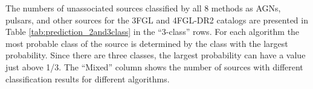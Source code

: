 \begin{table}[!h]
\centering
\hspace{-0.2cm}
    \vspace{2mm}
    \caption{Testing accuracy of the four selected algorithms for the 3-class classification of 4FGL-DR2 sources. 
    ``\_O'' denotes training with oversampling.}
    \label{tab:selected_algs_4fgl_multi}
\end{table}


The numbers of unassociated sources classified by all 8 methods as AGNs, pulsars, and other sources for the 3FGL and 4FGL-DR2 catalogs are presented in Table \ref{tab:prediction_2and3class} in the ``3-class'' rows.
For each algorithm the most probable class of the source is determined by the class with the largest probability.
Since there are three classes, the largest probability can have a value just above 1/3.
The ``Mixed'' column shows the number of sources with different classification results for different algorithms.


